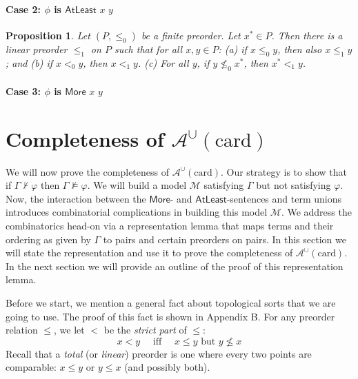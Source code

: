 \documentclass[letterpaper]{article} %
\newtheorem{proposition}[theorem]{Proposition}
\theoremstyle{definition}
\newcommand{\Model}{\mathcal{M}}
\newcommand{\proves}{\vdash}
\newcommand{\quadiff}{\quad \mbox{ iff } \quad}
\newcommand{\Aunion}{\mathscr{A}^{\cup}}
\newcommand{\Atleast}[2]{\mathsf{AtLeast}\,\,#1\,\,#2}
\newcommand{\More}[2]{\mathsf{More}\,\,#1\,\,#2}
\newcommand{\AtleastNoArgs}{\mathsf{AtLeast}}
\newcommand{\MoreNoArgs}{\mathsf{More}}
\newcommand{\card}{\mathrm{card}}
\begin{document}
{ \paragraph{Case 2: $\phi$ is $\Atleast{x}{y}$} 
 
 \begin{proposition}
\label{prop-extension-second}
Let $(P,\leq_0)$ be a finite preorder. 
Let $x^*\in P$.  Then there is a linear preorder $\leq_1$ on $P$ 
such that for all $x,y\in P$:
(a) if $x \leq_0 y$, then also $x\leq_1 y$; and 
(b) if $x <_0 y$, then $x <_1 y$.
(c) For all $y$, if $y \nleq_0 x^*$, then $x^* <_1 y$.
\end{proposition}

 
  \paragraph{Case 3: $\phi$ is $\More{x}{y}$}
  
\section{Completeness of $\Aunion(\card)$}\label{s:comp_Aunion(card)}
\label{section-completeness}


We will now prove the completeness of $\Aunion(\card)$.  Our strategy is to show that if $\Gamma \not \proves \varphi$ then $\Gamma \not \models \varphi$.  We will build a model $\Model$ satisfying $\Gamma$ but not satisfying $\varphi$.  Now, the interaction between the $\MoreNoArgs$- and $\AtleastNoArgs$-sentences and term unions introduces combinatorial complications in building this model $\Model$.  We address the combinatorics head-on via a representation lemma that maps terms and their ordering as given by $\Gamma$ to pairs and certain preorders on pairs. 
In this section we will state the representation and use it to prove the completeness of $\Aunion(\card)$.  In the next section we will provide an outline of the proof of this representation lemma.

Before we start, 
we mention a general fact about topological sorts that we are going to use.  The proof of this fact is shown in Appendix B.
For any preorder relation $\leq$, we let $<$ be the \emph{strict part} of $\leq$:
  \[ x < y \quadiff x \leq y \mbox{ but } y \nleq x\]
 Recall that a \emph{total} (or \emph{linear}) preorder is one where every two points are comparable:
 $x\leq y$ or $y\leq x$ (and possibly both).
 
}
\end{document}
